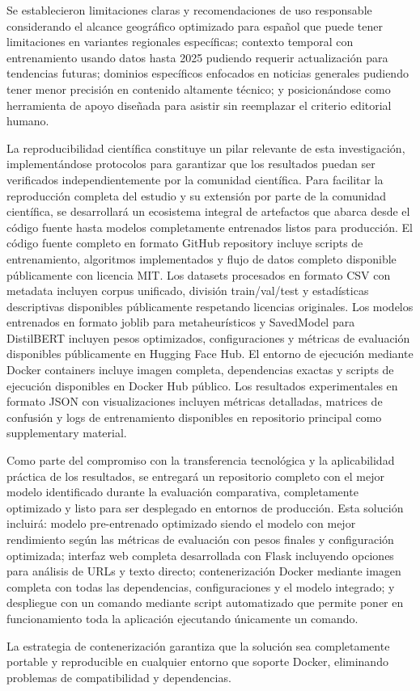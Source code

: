 Se establecieron limitaciones claras y recomendaciones de uso responsable considerando el alcance geográfico optimizado para español que puede tener limitaciones en variantes regionales específicas; contexto temporal con entrenamiento usando datos hasta 2025 pudiendo requerir actualización para tendencias futuras; dominios específicos enfocados en noticias generales pudiendo tener menor precisión en contenido altamente técnico; y posicionándose como herramienta de apoyo diseñada para asistir sin reemplazar el criterio editorial humano.

La reproducibilidad científica constituye un pilar relevante de esta investigación, implementándose protocolos para garantizar que los resultados puedan ser verificados independientemente por la comunidad científica. Para facilitar la reproducción completa del estudio y su extensión por parte de la comunidad científica, se desarrollará un ecosistema integral de artefactos que abarca desde el código fuente hasta modelos completamente entrenados listos para producción. El código fuente completo en formato GitHub repository incluye scripts de entrenamiento, algoritmos implementados y flujo de datos completo disponible públicamente con licencia MIT. Los datasets procesados en formato CSV con metadata incluyen corpus unificado, división train/val/test y estadísticas descriptivas disponibles públicamente respetando licencias originales. Los modelos entrenados en formato joblib para metaheurísticos y SavedModel para DistilBERT incluyen pesos optimizados, configuraciones y métricas de evaluación disponibles públicamente en Hugging Face Hub. El entorno de ejecución mediante Docker containers incluye imagen completa, dependencias exactas y scripts de ejecución disponibles en Docker Hub público. Los resultados experimentales en formato JSON con visualizaciones incluyen métricas detalladas, matrices de confusión y logs de entrenamiento disponibles en repositorio principal como supplementary material.

Como parte del compromiso con la transferencia tecnológica y la aplicabilidad práctica de los resultados, se entregará un repositorio completo con el mejor modelo identificado durante la evaluación comparativa, completamente optimizado y listo para ser desplegado en entornos de producción. Esta solución incluirá: modelo pre-entrenado optimizado siendo el modelo con mejor rendimiento según las métricas de evaluación con pesos finales y configuración optimizada; interfaz web completa desarrollada con Flask incluyendo opciones para análisis de URLs y texto directo; contenerización Docker mediante imagen completa con todas las dependencias, configuraciones y el modelo integrado; y despliegue con un comando mediante script automatizado que permite poner en funcionamiento toda la aplicación ejecutando únicamente un comando.

La estrategia de contenerización garantiza que la solución sea completamente portable y reproducible en cualquier entorno que soporte Docker, eliminando problemas de compatibilidad y dependencias.